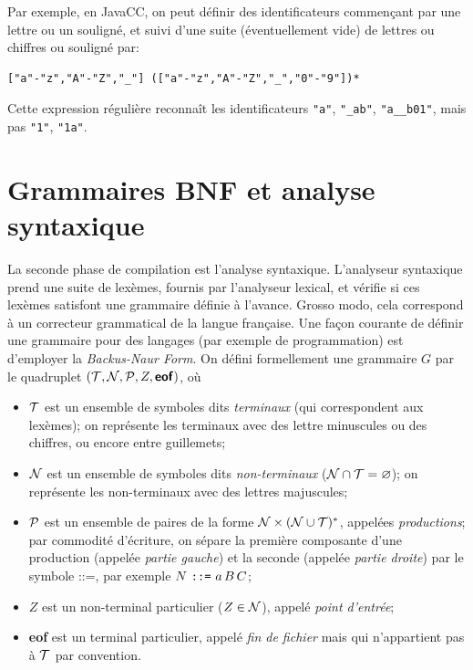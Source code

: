 \documentclass[11pt,a4paper]{article}
\newcommand{\T}{{\cal T}}
\newcommand{\N}{{\cal N}}
\newcommand{\Prod}{{\cal P}}
\newcommand{\assign}{\mbox{\texttt{::=}}\xspace}
\newcommand{\JavaCC}{\textsf{JavaCC}\xspace}
\newcommand{\str}[1]{\texttt{"{#1}"}}
\newcommand{\eof}{\textsf{\textbf{eof}}\xspace}
\begin{document}
Par exemple, en \JavaCC, on peut définir des identificateurs
commençant par une lettre ou un souligné, et suivi d'une suite
(éventuellement vide) de lettres ou chiffres ou souligné par:

\begin{verbatim}
["a"-"z","A"-"Z","_"] (["a"-"z","A"-"Z","_","0"-"9"])*
\end{verbatim}

Cette expression régulière reconnaît les identificateurs \str{a},
\str{\_ab}, \str{a\_\_b01}, mais pas \str{1}, \str{1a}.

\section{Grammaires BNF et analyse syntaxique\label{BNF}}

La seconde phase de compilation est l'analyse syntaxique. L'analyseur
syntaxique prend une suite de lexèmes, fournis par l'analyseur
lexical, et vérifie si ces lexèmes satisfont une grammaire définie à
l'avance. Grosso modo, cela correspond à un correcteur grammatical de
la langue française. Une façon courante de définir une grammaire pour
des langages (par exemple de programmation) est d'employer la
\emph{Backus-Naur Form}. On défini formellement une grammaire $G$ par
le quadruplet $(\T, \N, \Prod, Z, \eof)$, où

\begin{itemize}

  \item $\T$ est un ensemble de symboles dits \emph{terminaux} (qui
        correspondent aux lexèmes); on représente les terminaux avec
        des lettre minuscules ou des chiffres, ou encore entre
        guillemets;

  \item $\N$ est un ensemble de symboles dits \emph{non-terminaux}
        ($\N \cap \T = \varnothing$); on représente les non-terminaux
        avec des lettres majuscules;

  \item $\Prod$ est un ensemble de paires de la forme $\N \times (\N
        \cup \T)^{*}$, appelées \emph{productions}; par commodité
        d'écriture, on sépare la première composante d'une production
        (appelée \emph{partie gauche}) et la seconde (appelée
        \emph{partie droite}) par le symbole \mbox{::=}, par exemple
        $N \ \assign \ a \, B \, C$;

  \item $Z$ est un non-terminal particulier ($Z \in \N$), appelé
        \emph{point d'entrée};

  \item \eof est un terminal particulier, appelé \emph{fin de
        fichier} mais qui n'appartient pas à $\T$ par convention.

\end{itemize}
\end{document}
